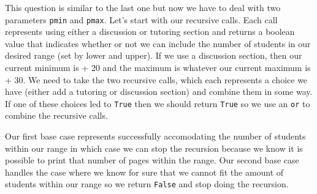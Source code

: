     \begin{solution}
    \begin{blocksection}
    
    This question is similar to the last one but now we have to deal with two parameters \lstinline{pmin} and \lstinline{pmax}. 
    Let's start with our recursive calls. Each call represents using either a discussion or tutoring section and 
    returns a boolean value that indicates whether or not we can include the number of students in our desired range (set by lower and upper).
    If we use a discussion section, then our current minimum is + 20 and the maximum is whatever our current maximum is + 30. We need to take the two recursive calls, 
    which each represents a choice we have (either add a tutoring or discussion section) and combine them in some way. 
    If one of these choices led to \lstinline{True} then we should return \lstinline{True} so we use an \lstinline{or} to combine the recursive calls.
    
    Our first base case represents successfully accomodating the number of students within our range in which case we can stop the recursion because we 
    know it is possible to print that number of pages within the range. Our second base case handles the case where we know for sure that we cannot 
    fit the amount of students within our range so we return \lstinline{False} and stop doing the recursion.
    \end{blocksection}
    \end{solution}
    
